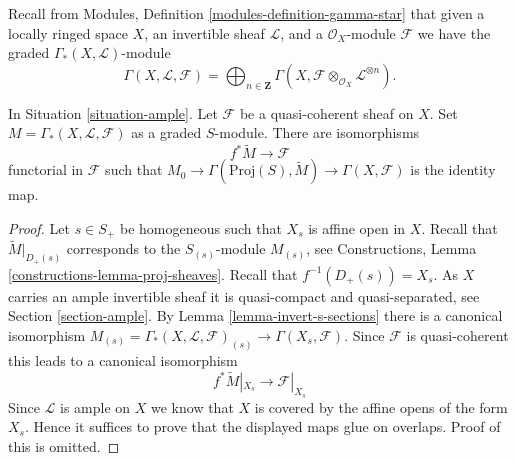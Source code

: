 \noindent
Recall from Modules, Definition \ref{modules-definition-gamma-star}
that given a locally ringed space $X$, an invertible sheaf $\mathcal{L}$,
and a $\mathcal{O}_X$-module $\mathcal{F}$ we have the graded
$\Gamma_*(X, \mathcal{L})$-module
$$
\Gamma(X, \mathcal{L}, \mathcal{F}) =
\bigoplus\nolimits_{n \in \mathbf{Z}}
\Gamma(X, \mathcal{F} \otimes_{\mathcal{O}_X} \mathcal{L}^{\otimes n}).
$$

\begin{lemma}
\label{lemma-ample-quasi-coherent}
In Situation \ref{situation-ample}.
Let $\mathcal{F}$ be a quasi-coherent sheaf on $X$.
Set $M = \Gamma_*(X, \mathcal{L}, \mathcal{F})$ as a graded $S$-module.
There are isomorphisms
$$
f^*\widetilde{M} \longrightarrow \mathcal{F}
$$
functorial in $\mathcal{F}$ such that
$M_0 \to \Gamma(\text{Proj}(S), \widetilde{M}) \to \Gamma(X, \mathcal{F})$
is the identity map.
\end{lemma}

\begin{proof}
Let $s \in S_{+}$ be homogeneous such that $X_s$ is affine open in $X$.
Recall that $\widetilde{M}|_{D_{+}(s)}$ corresponds to the
$S_{(s)}$-module $M_{(s)}$, see
Constructions, Lemma \ref{constructions-lemma-proj-sheaves}.
Recall that $f^{-1}(D_{+}(s)) = X_s$.
As $X$ carries an ample invertible sheaf it is quasi-compact and
quasi-separated, see Section \ref{section-ample}.
By Lemma \ref{lemma-invert-s-sections} there is a canonical isomorphism
$M_{(s)} = \Gamma_*(X, \mathcal{L}, \mathcal{F})_{(s)} \to
\Gamma(X_s, \mathcal{F})$.
Since $\mathcal{F}$ is quasi-coherent this leads to
a canonical isomorphism
$$
f^*\widetilde{M}|_{X_s} \to \mathcal{F}|_{X_s}
$$
Since $\mathcal{L}$ is ample on $X$ we know that $X$ is covered
by the affine opens of the form $X_s$. Hence it suffices to prove
that the displayed maps glue on overlaps. Proof of this is
omitted.
\end{proof}


